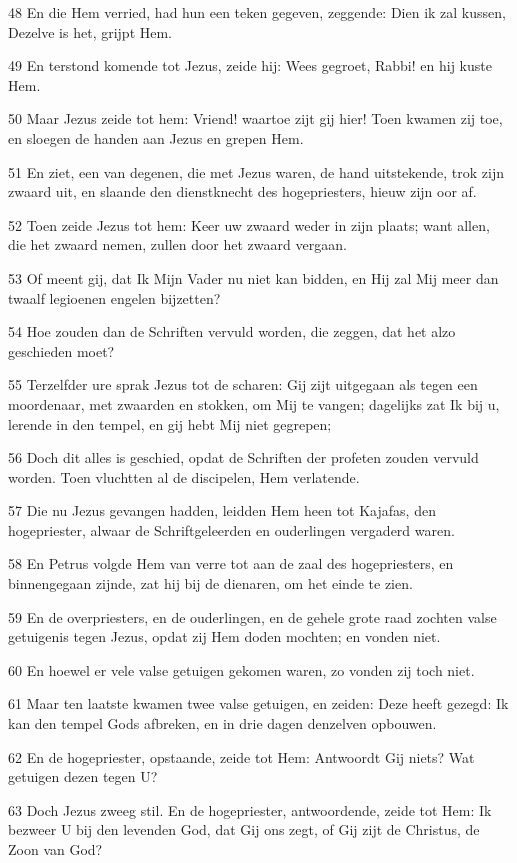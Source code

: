 \par 48 En die Hem verried, had hun een teken gegeven, zeggende: Dien ik zal kussen, Dezelve is het, grijpt Hem.
\par 49 En terstond komende tot Jezus, zeide hij: Wees gegroet, Rabbi! en hij kuste Hem.
\par 50 Maar Jezus zeide tot hem: Vriend! waartoe zijt gij hier! Toen kwamen zij toe, en sloegen de handen aan Jezus en grepen Hem.
\par 51 En ziet, een van degenen, die met Jezus waren, de hand uitstekende, trok zijn zwaard uit, en slaande den dienstknecht des hogepriesters, hieuw zijn oor af.
\par 52 Toen zeide Jezus tot hem: Keer uw zwaard weder in zijn plaats; want allen, die het zwaard nemen, zullen door het zwaard vergaan.
\par 53 Of meent gij, dat Ik Mijn Vader nu niet kan bidden, en Hij zal Mij meer dan twaalf legioenen engelen bijzetten?
\par 54 Hoe zouden dan de Schriften vervuld worden, die zeggen, dat het alzo geschieden moet?
\par 55 Terzelfder ure sprak Jezus tot de scharen: Gij zijt uitgegaan als tegen een moordenaar, met zwaarden en stokken, om Mij te vangen; dagelijks zat Ik bij u, lerende in den tempel, en gij hebt Mij niet gegrepen;
\par 56 Doch dit alles is geschied, opdat de Schriften der profeten zouden vervuld worden. Toen vluchtten al de discipelen, Hem verlatende.
\par 57 Die nu Jezus gevangen hadden, leidden Hem heen tot Kajafas, den hogepriester, alwaar de Schriftgeleerden en ouderlingen vergaderd waren.
\par 58 En Petrus volgde Hem van verre tot aan de zaal des hogepriesters, en binnengegaan zijnde, zat hij bij de dienaren, om het einde te zien.
\par 59 En de overpriesters, en de ouderlingen, en de gehele grote raad zochten valse getuigenis tegen Jezus, opdat zij Hem doden mochten; en vonden niet.
\par 60 En hoewel er vele valse getuigen gekomen waren, zo vonden zij toch niet.
\par 61 Maar ten laatste kwamen twee valse getuigen, en zeiden: Deze heeft gezegd: Ik kan den tempel Gods afbreken, en in drie dagen denzelven opbouwen.
\par 62 En de hogepriester, opstaande, zeide tot Hem: Antwoordt Gij niets? Wat getuigen dezen tegen U?
\par 63 Doch Jezus zweeg stil. En de hogepriester, antwoordende, zeide tot Hem: Ik bezweer U bij den levenden God, dat Gij ons zegt, of Gij zijt de Christus, de Zoon van God?

